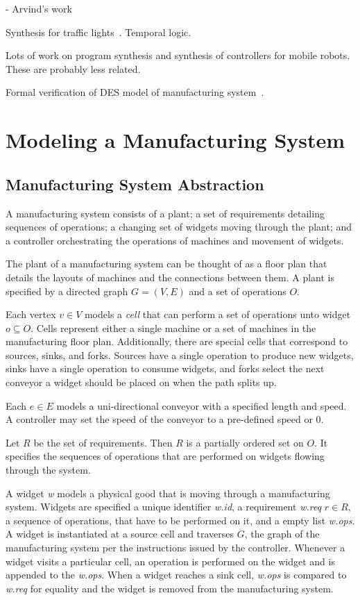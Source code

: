 \documentclass[9pt,conference, compsocconf]{IEEEtran}
\begin{document}
- Arvind's work

Synthesis for traffic lights~\cite{coogan2017formal}.
Temporal logic.

Lots of work on program synthesis and synthesis of controllers for mobile robots. These are probably less related.


Formal verification of DES model of manufacturing system~\cite{ZhangKLMA13}.

\section{Modeling a Manufacturing System}

	\subsection{Manufacturing System Abstraction}
	A manufacturing system consists of a plant; a set of requirements detailing sequences of operations; a changing set of widgets moving through the plant; and a controller orchestrating the operations of machines and movement of widgets.
	
	The plant of a manufacturing system can be thought of as a floor plan that details the layouts of machines and the connections between them. A plant is specified by a directed graph $G = (V, E)$ and a set of operations $O$. 
	
	Each vertex $v \in V$ models a \emph{cell} that can perform a set of operations unto widget $o \subseteq O$. Cells represent either a single machine or a set of machines in the manufacturing floor plan. Additionally, there are special cells that correspond to sources, sinks, and forks. Sources have a single operation to produce new widgets, sinks have a single operation to consume widgets, and forks select the next conveyor a widget should be placed on when the path splits up.
	
	Each $e \in E$ models a uni-directional conveyor with a specified length and speed. A controller may set the speed of the conveyor to a pre-defined speed or 0. 
	
	Let $R$ be the set of requirements. Then $R$ is a partially ordered set on $O$. It specifies the sequences of operations that are performed on widgets flowing through the system.
	
	A widget \emph{w} models a physical good that is moving through a manufacturing system. Widgets are specified a unique identifier \emph{w.id}, a requirement \emph{w.req} $r \in R$, a sequence of operations, that have to be performed on it, and a empty list \emph{w.ops}. A widget is instantiated at a source cell and traverses $G$, the graph of the manufacturing system per the instructions issued by the controller. Whenever a widget visits a particular cell, an operation is performed on the widget and is appended to the \emph{w.ops}. When a widget reaches a sink cell, \emph{w.ops} is compared to \emph{w.req} for equality and the widget is removed from the manufacturing system.
	
\end{document}

